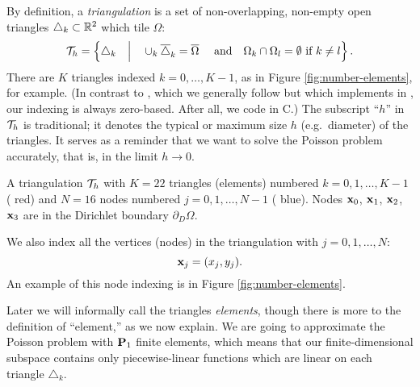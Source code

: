 By definition, a \emph{triangulation} is a set of non-overlapping, non-empty open triangles $\triangle_k\subset \mathbb{R}^2$ which tile $\Omega$:
\begin{equation*}
\mathcal{T}_h = \left\{\triangle_k \quad\Big|\quad \cup_k \overline{\triangle}_k = \overline{\Omega} \quad \text{ and} \quad \Omega_k \cap \Omega_l = \emptyset \text{ if } k\ne l\right\}.
\end{equation*}
There are $K$ triangles indexed $k=0,\dots,K-1$, as in Figure \ref{fig:number-elements}, for example.  (In contrast to \citet{Elmanetal2005}, which we generally follow but which implements in \Matlab, our indexing is always zero-based.  After all, we code in C.)  The subscript ``$h$'' in $\mathcal{T}_h$ is traditional; it denotes the typical or maximum size $h$ (e.g.~diameter) of the triangles.  It serves as a reminder that we want to solve the Poisson problem accurately, that is, in the limit $h\to 0$.

\begin{marginfigure}

\caption{A triangulation $\mathcal{T}_h$ with $K=22$ triangles (elements) numbered $k=0,1,\dots,K-1$ ({\color{red} red}) and $N=16$ nodes numbered $j=0,1,\dots,N-1$  ({\color{blue} blue}).  Nodes $\mathbf{x}_0$, $\mathbf{x}_1$, $\mathbf{x}_2$, $\mathbf{x}_3$ are in the Dirichlet boundary $\partial_D\Omega$.}
\label{fig:number-elements}
\end{marginfigure}

We also index all the vertices (nodes) in the triangulation with $j=0,1,\dots,N$:
\begin{equation*}
\mathbf{x}_j = (x_j,y_j).
\end{equation*}
An example of this node indexing is in Figure \ref{fig:number-elements}.

Later we will informally call the triangles \emph{elements}, though there is more to the definition of ``element,'' as we now explain.  We are going to approximate the Poisson problem with $\mathbf{P}_1$ finite elements, which means that our finite-dimensional subspace contains only piecewise-linear functions which are linear on each triangle $\triangle_k$.

